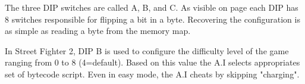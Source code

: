 The three DIP switches are called A, B, and C. As visible on page \pageref{fig:boarda} each DIP has 8 switches responsible for flipping a bit in a byte. Recovering the configuration is as simple as reading a byte from the memory map.

\begin{trivia}
In Street Fighter 2, DIP B is used to configure the difficulty level of the game ranging from 0 to 8 (4=default). Based on this value the A.I selects appropriates set of bytecode\cite{sf2aiengine} script. Even in easy mode, the A.I cheats by skipping "charging"\cite{sf2aiengine}.
\end{trivia}



